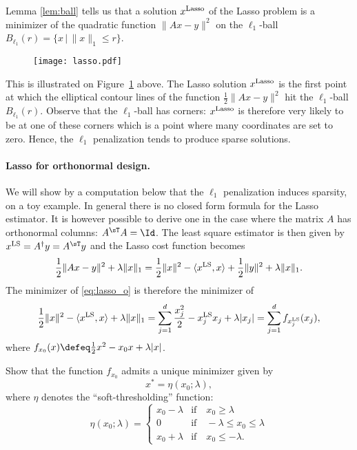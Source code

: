 \documentclass[11pt,nocut]{article}
\begin{document}
Lemma \ref{lem:ball} tells us that a solution $x^{\rm Lasso}$ of the Lasso problem is a minimizer of the quadratic function $\|Ax-y\|^2$ on the $\ell_1$-ball $B_{\ell_1}(r) = \{x \, | \, \|x\|_1 \leq r\}$.

\begin{figure}[h!]
	\begin{center}
		\texttt{[image: lasso.pdf]}
	\end{center}
	\caption{}
	\label{fig:lasso}
\end{figure}
This is illustrated on Figure~\ref{fig:lasso} above. The Lasso solution $x^{\rm Lasso}$ is the first point at which the elliptical contour lines of the function $\frac{1}{2}\|Ax-y\|^2$ hit the $\ell_1$-ball $B_{\ell_1}(r)$. Observe that the $\ell_1$-ball has corners: $x^{\rm Lasso}$ is therefore very likely to be at one of these corners which is a point where many coordinates are set to zero. Hence, the $\ell_1$ penalization tends to produce sparse solutions.
\\

\paragraph{Lasso for orthonormal design.}
We will show by a computation below that the $\ell_1$ penalization induces sparsity, on a toy example.
In general there is no closed form formula for the Lasso estimator. It is however possible to derive one in the case where the matrix $A$ has orthonormal columns: $A^{\sT} A = \Id$. 
The least square estimator is then given by $x^{\rm LS} = A^{\dagger}y = A^{\sT} y$ and the Lasso cost function becomes
\begin{equation}\label{eq:lasso_o}
\frac{1}{2} \| Ax - y \|^2 + \lambda \|x\|_1 
= \frac{1}{2} \|x\|^2 - \langle x^{\rm LS}, x \rangle + \frac{1}{2} \|y\|^2 + \lambda \|x\|_1.
\end{equation}
The minimizer of \eqref{eq:lasso_o} is therefore the minimizer of
$$
\frac{1}{2} \|x\|^2 - \langle x^{\rm LS}, x \rangle + \lambda \|x\|_1
=
\sum_{j=1}^d \frac{x_j^2}{2} - x^{\rm LS}_j x_j + \lambda |x_j| 
=
\sum_{j=1}^d f_{x_j^{\rm LS}}(x_j),
$$
where $f_{x_0}(x) \defeq \frac{1}{2}x^2 - x_0 x + \lambda |x|$.

\begin{exercise}
	Show that the function $f_{x_0}$ admits a unique minimizer given by
	$$
	x^* = \eta(x_0; \lambda),
	$$
	where $\eta$ denotes the ``soft-thresholding'' function:
	$$
	\eta(x_0;\lambda) = 
	\begin{cases}
		x_0-\lambda & \text{if} \quad x_0 \geq \lambda \\
		0 & \text{if} \quad -\lambda \leq x_0 \leq \lambda \\
		x_0 + \lambda & \text{if} \quad x_0 \leq -\lambda.
	\end{cases}
	$$
\end{exercise}
\vspace{2mm}
\end{document}
